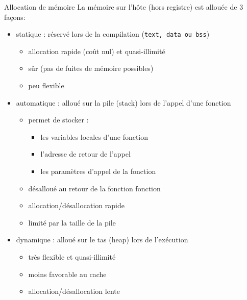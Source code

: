 \documentclass[11pt,mathserif]{beamer}
\newcommand{\scout}{\faAngellist}
\newcommand{\gezi}{\faLongArrowRight}
\newcommand{\argi}{\faLightbulbO}
\newcommand{\kontuz}{\faExclamationTriangle}
\newcommand{\pozik}{\faSmileO}
\newcommand{\triste}{\faFrownO}
\newif\ifC
\begin{document}
\begin{frame}{Allocation de mémoire}
La mémoire sur l'hôte (hors registre) est allouée de 3 façons: 
\begin{itemize}[<+->]
  \item statique : réservé lors de la compilation ({\tt text, data ou bss})
    \begin{itemize}
      \item[\pozik] allocation rapide (coût nul) et quasi-illimité
      \item[\pozik] sûr (pas de fuites de mémoire possibles)
      \item[\triste] peu flexible
    \end{itemize}
  \item automatique : alloué sur la pile (\og{}stack\fg{}) lors de l'appel d'une fonction
    \begin{itemize}
      \item[\scout] permet de stocker : 
      \begin{itemize}
        \item les variables locales d'une fonction
        \item l'adresse de retour de l'appel
        \item les paramètres d'appel de la fonction
      \end{itemize}
    \item[\argi] désalloué au retour de la fonction fonction
      \item[\pozik] allocation/désallocation rapide
      \item[\kontuz] limité par la taille de la pile
    \end{itemize}
  \item dynamique : alloué sur le tas (\og{}heap\fg{}) lors de l'exécution
  \begin{itemize}
      \item[\pozik] très flexible et quasi-illimité
      \item[\triste] moins favorable au cache
      \item[\triste] allocation/désallocation lente
      \ifC \item[\kontuz] à la discrétion du codeur \gezi fuites possibles de mémoire \else \fi
    \end{itemize}
\end{itemize}
\end{frame}
\end{document}
